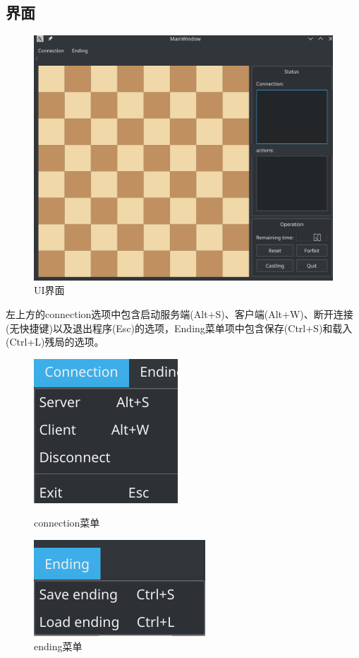 \documentclass[a4paper,10pt]{article}
\begin{document}
\subsection{界面}
\begin{figure}[htbp]
 \centering
 \includegraphics[width=.8\textwidth]{ui.png}
 \caption{UI界面}
 \label{fig1}
\end{figure}
左上方的connection选项中包含启动服务端(Alt+S)、客户端(Alt+W)、断开连接(无快捷键)以及退出程序(Esc)的选项，Ending菜单项中包含保存(Ctrl+S)和载入(Ctrl+L)残局的选项。\par
\begin{figure}[htbp]
 \centering
 
        \begin{minipage}[b]{.49\textwidth}
        \centering
        \includegraphics[width=.5\textwidth]{connection.png}
        \caption{connection菜单}
        \label{fig2}
        \end{minipage}
        \begin{minipage}[b]{.49\textwidth}
        \centering
        \includegraphics[width=.5\textwidth]{ending.png}
        \caption{ending菜单}
        \label{fig3}
        \end{minipage}

\end{figure}
\end{document}
